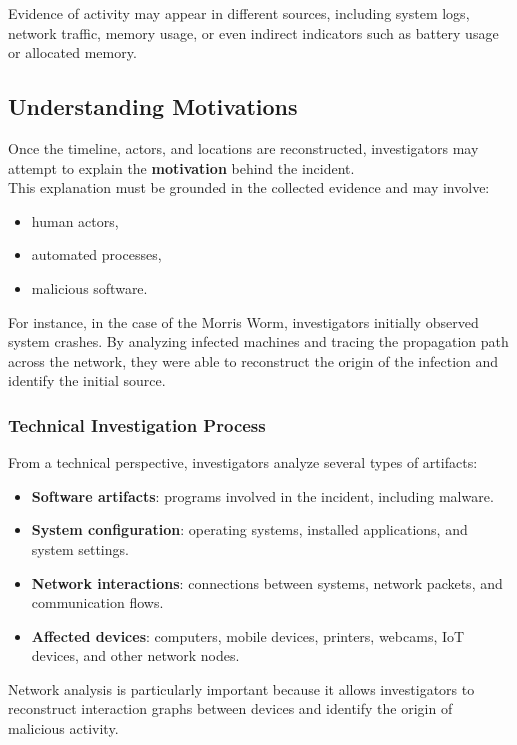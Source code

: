 \noindent
Evidence of activity may appear in different sources, including system logs, network traffic, memory usage, or even indirect indicators such as battery usage or allocated memory.

\subsection {Understanding Motivations}

Once the timeline, actors, and locations are reconstructed, investigators may attempt to explain the \textbf{motivation} behind the incident.\\
This explanation must be grounded in the collected evidence and may involve:
\begin{itemize}
\item human actors,
\item automated processes,
\item malicious software.
\end{itemize}
\noindent
For instance, in the case of the Morris Worm, investigators initially observed system crashes. By analyzing infected machines and tracing the propagation path across the network, they were able to reconstruct the origin of the infection and identify the initial source.

\subsubsection{Technical Investigation Process}

From a technical perspective, investigators analyze several types of artifacts:

\begin{itemize}
\item \textbf{Software artifacts}: programs involved in the incident, including malware.
\item \textbf{System configuration}: operating systems, installed applications, and system settings.
\item \textbf{Network interactions}: connections between systems, network packets, and communication flows.
\item \textbf{Affected devices}: computers, mobile devices, printers, webcams, IoT devices, and other network nodes.
\end{itemize}

\noindent
Network analysis is particularly important because it allows investigators to reconstruct interaction graphs between devices and identify the origin of malicious activity.

